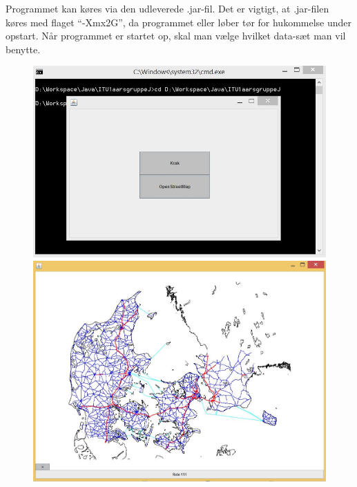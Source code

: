 Programmet kan køres via den udleverede .jar-fil. Det er vigtigt, at .jar-filen køres med flaget ``-Xmx2G'', da programmet eller løber tør for hukommelse under opstart. Når programmet er startet op, skal man vælge hvilket data-sæt man vil benytte.

\begin{figure}
\centering
\begin{minipage}{.5\textwidth}
  \centering
	\includegraphics[width=(\textwidth)/2]{brugervejledning/vaelgdata}
  \end{minipage}%
\begin{minipage}{.5\textwidth}
  \centering
\includegraphics[width=(\textwidth)/2]{brugervejledning/renkort}
\end{minipage}
\end{figure}


